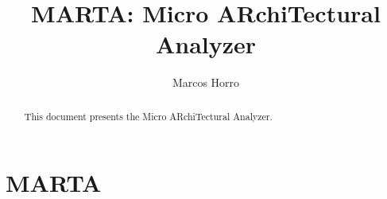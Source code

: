 \documentclass[a4paper,12pt]{IEEEtran}
\title{\textbf{MARTA}: \textbf{M}icro \textbf{AR}chi\textbf{T}ectural \textbf{A}nalyzer}
\author{Marcos Horro}
\begin{document}
\maketitle

\begin{abstract}
    This document presents the Micro ARchiTectural Analyzer.
\end{abstract}

\section*{MARTA}

\newpage


\end{document}
